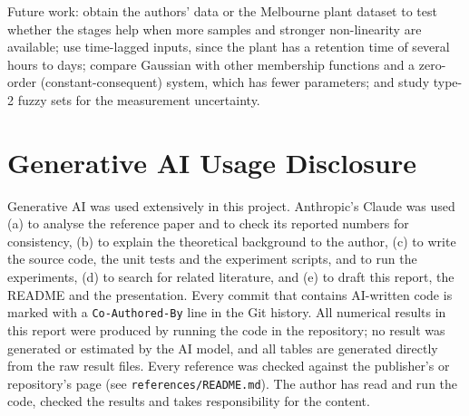 \documentclass[conference]{IEEEtran}
\begin{document}
Future work: obtain the authors' data or the Melbourne plant dataset to test whether the stages help when more samples and stronger non-linearity are available; use time-lagged inputs, since the plant has a retention time of several hours to days; compare Gaussian with other membership functions and a zero-order (constant-consequent) system, which has fewer parameters; and study type-2 fuzzy sets for the measurement uncertainty.

\section*{Generative AI Usage Disclosure}
Generative AI was used extensively in this project. Anthropic's Claude was used (a) to analyse the reference paper and to check its reported numbers for consistency, (b) to explain the theoretical background to the author, (c) to write the source code, the unit tests and the experiment scripts, and to run the experiments, (d) to search for related literature, and (e) to draft this report, the README and the presentation. Every commit that contains AI-written code is marked with a \texttt{Co-Authored-By} line in the Git history. All numerical results in this report were produced by running the code in the repository; no result was generated or estimated by the AI model, and all tables are generated directly from the raw result files. Every reference was checked against the publisher's or repository's page (see \texttt{references/README.md}). The author has read and run the code, checked the results and takes responsibility for the content.
\end{document}
